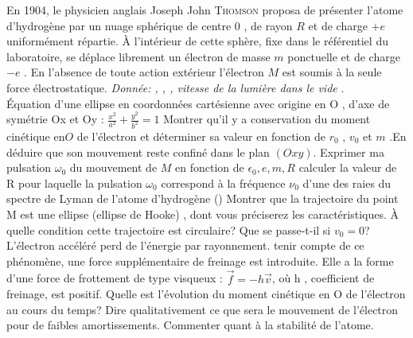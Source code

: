 \begin{Exercise}[title=Modèle Atomique de Thomson]
  En 1904, le physicien anglais Joseph John \textsc{Thomson} proposa de présenter
  l'atome d'hydrogène par un nuage sphérique de centre $0$ , de rayon $R$ et de
  charge $+e$ uniformément répartie. À l'intérieur de cette sphère, fixe
  dans le référentiel du laboratoire, se déplace librement un électron de masse
  $m$ ponctuelle et de charge $-e$ .
  En l'absence de toute action extérieur l'électron $M$ est soumis à la seule
  force électrostatique.
  \emph{Donnée: ,  ,
    , vitesse de la lumière dans le vide
    }. \\
  Équation d'une ellipse en coordonnées cartésienne avec origine en O , d'axe de
  symétrie Ox et Oy : $\frac{x^2}{a^2}+\frac{y^2}{b^2}=1$
    \Question Montrer qu'il y a conservation du moment cinétique en$O$ de
    l'électron et déterminer sa valeur en fonction de $r_0$ , $v_0$ et $m$ .En
    déduire que son mouvement reste confiné dans le plan $( Oxy )$.
    \Question Exprimer ma pulsation $\omega_0$ du mouvement de $M$ en fonction de
    $\epsilon_0,e,m,R$ calculer la valeur de R pour laquelle la pulsation $\omega_0$ correspond
    à la fréquence $\nu_0$ d'une des raies du spectre de Lyman de l'atome d'hydrogène
    ()
    \Question Montrer que la trajectoire du point M est une ellipse (ellipse de
    Hooke) , dont vous préciserez les caractéristiques.
    \Question À quelle condition cette trajectoire est circulaire? Que se
    passe-t-il si $v_0=0$?
    \Question L'électron accéléré perd de l'énergie par rayonnement. tenir
    compte de ce phénomène, une force supplémentaire de freinage est introduite.
    Elle a la forme d'une force de frottement de type visqueux :
    $\vec{f}=-h\vec{v} $, où h , coefficient de freinage, est positif.
    \subQuestion Quelle est l'évolution du moment cinétique en O de l'électron
    au cours du temps?
    \subQuestion Dire qualitativement ce que sera le mouvement de l'électron pour de
    faibles amortissements.
    \subQuestion Commenter quant à la stabilité de l'atome.
\end{Exercise}
